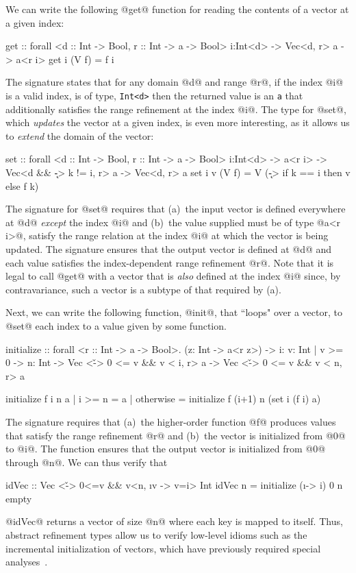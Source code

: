 {{{{
We can write the following @get@ function for reading the contents
of a vector at a given index:
%
\begin{code}
  get :: forall <d :: Int -> Bool, r :: Int -> a -> Bool>
            i:Int<d> -> Vec<d, r> a -> a<r i>
  get i (V f) = f i
\end{code}
%
The signature states that for any domain @d@ and range @r@,
if the index @i@ is a valid index, \ie is of type, \verb+Int<d>+ 
then the returned value is an \verb+a+ that additionally satisfies the
range refinement at the index @i@.
%
The type for @set@, which \emph{updates} the vector at
a given index, is even more interesting, as it allows us to 
\emph{extend} the domain of the vector:
%
\begin{code}
  set :: forall <d :: Int -> Bool, r :: Int -> a -> Bool>
         i:Int<d>
      -> a<r i>
      -> Vec<d && {\k -> k != i}, r> a
      -> Vec<d, r> a
  set i v (V f) = V (\k -> if k == i then v else f k)
\end{code}
%
The signature for @set@ requires that 
(a)~the input vector is defined everywhere at @d@ \emph{except}
the index @i@ and 
(b)~the value supplied must be of type @a<r i>@, \ie satisfy the range 
relation at the index @i@ at which the vector is being updated.
The signature ensures that the output vector is defined at
@d@ and each value satisfies the index-dependent range refinement @r@.
%
Note that it is legal to call @get@ with a vector that is \emph{also} 
defined at the index @i@ since, by contravariance, such a vector is a
subtype of that required by (a).


 Next, we can write the following function,
@init@, that ``loops" over a vector, to @set@ each index to 
a value given by some function.
%
\begin{code}
  initialize :: forall <r :: Int -> a -> Bool>.
                (z: Int -> a<r z>) 
             -> i: {v: Int | v >= 0} 
             -> n: Int 
             -> Vec <{\v -> 0 <= v && v < i}, r> a 
             -> Vec <{\v -> 0 <= v && v < n}, r> a 

  initialize f i n a 
    | i >= n    = a
    | otherwise = initialize f (i+1) n (set i (f i) a)
\end{code}
%
The signature requires that 
(a)~the higher-order function @f@ produces values that satisfy 
the range refinement @r@ and 
(b)~the vector is initialized from @0@ to @i@.
%
The function ensures that the output vector is initialized from @0@
through @n@.
%
We can thus verify that
%
\begin{code}
  idVec   :: Vec <{\v -> 0<=v && v<n}, {\i v -> v=i}> Int
  idVec n = initialize (\i -> i) 0 n empty
\end{code}
%
\ie @idVec@ returns a vector of size @n@ where each
key is mapped to itself. Thus, abstract refinement types allow us 
to verify low-level idioms such as the incremental initialization 
of vectors, which have previously required 
special analyses~\cite{Gopan05,JhalaMcMillanCAV07,CousotsPOPL11}.

}}}}
